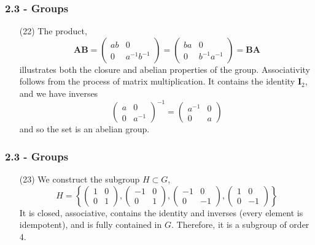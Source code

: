 \documentclass{beamer}
\begin{document}
\begin{frame}
\frametitle{2.3 - Groups}
\small
\begin{enumerate}
	\item[(22)] The product,
	\begin{equation*}
		\mathbf{AB} = 
		\begin{pmatrix}
			ab & 0 \\
			0 & a^{-1}b^{-1}
		\end{pmatrix} =
		\begin{pmatrix}
			ba & 0 \\
			0 & b^{-1}a^{-1}
		\end{pmatrix} = \mathbf{BA}
	\end{equation*}
	illustrates both the closure and abelian properties of the group. Associativity follows from the process of matrix multiplication. It contains the identity $\mathbf I_2$, and we have inverses
	\begin{equation*}
		\begin{pmatrix}
			a & 0 \\
			0 & a^{-1}
		\end{pmatrix}^{-1} =
		\begin{pmatrix}
			a^{-1} & 0 \\
			0 & a
		\end{pmatrix}
	\end{equation*}
	and so the set is an abelian group.
\end{enumerate}
\end{frame}
\begin{frame}
\frametitle{2.3 - Groups}
\small
\begin{enumerate}
	\item[(23)] We construct the subgroup $H \subset G$,
	\begin{equation*}
	H = \left\{
	\begin{pmatrix}
		1 & 0 \\
		0 & 1
	\end{pmatrix},
	\begin{pmatrix}
		-1 & 0 \\
		0 & 1
	\end{pmatrix},
	\begin{pmatrix}
		-1 & 0 \\
		0 & -1
	\end{pmatrix},
	\begin{pmatrix}
		1 & 0 \\
		0 & -1
	\end{pmatrix}
	\right\}
	\end{equation*}
	It is closed, associative, contains the identity and inverses (every element is idempotent), and is fully contained in $G$. Therefore, it is a subgroup of order 4.
\end{enumerate}
\end{frame}
\end{document}
